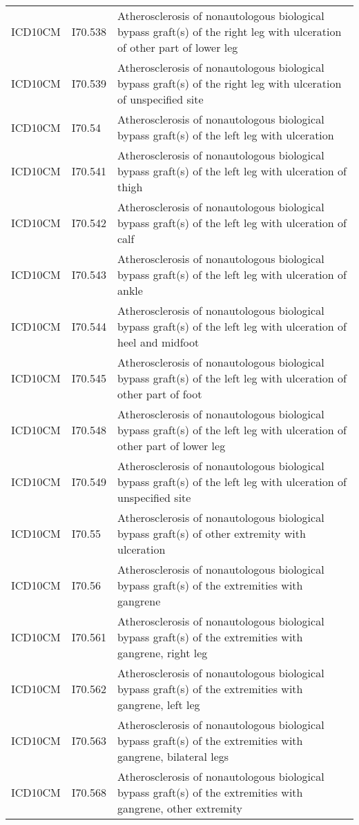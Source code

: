 \begin{longtable}{p{}p{}p{}}
  ICD10CM & I70.538 & Atherosclerosis of nonautologous biological bypass graft(s) of the right leg with ulceration of other part of lower leg \\ 
  ICD10CM & I70.539 & Atherosclerosis of nonautologous biological bypass graft(s) of the right leg with ulceration of unspecified site \\ 
  ICD10CM & I70.54 & Atherosclerosis of nonautologous biological bypass graft(s) of the left leg with ulceration \\ 
  ICD10CM & I70.541 & Atherosclerosis of nonautologous biological bypass graft(s) of the left leg with ulceration of thigh \\ 
  ICD10CM & I70.542 & Atherosclerosis of nonautologous biological bypass graft(s) of the left leg with ulceration of calf \\ 
  ICD10CM & I70.543 & Atherosclerosis of nonautologous biological bypass graft(s) of the left leg with ulceration of ankle \\ 
  ICD10CM & I70.544 & Atherosclerosis of nonautologous biological bypass graft(s) of the left leg with ulceration of heel and midfoot \\ 
  ICD10CM & I70.545 & Atherosclerosis of nonautologous biological bypass graft(s) of the left leg with ulceration of other part of foot \\ 
  ICD10CM & I70.548 & Atherosclerosis of nonautologous biological bypass graft(s) of the left leg with ulceration of other part of lower leg \\ 
  ICD10CM & I70.549 & Atherosclerosis of nonautologous biological bypass graft(s) of the left leg with ulceration of unspecified site \\ 
  ICD10CM & I70.55 & Atherosclerosis of nonautologous biological bypass graft(s) of other extremity with ulceration \\ 
  ICD10CM & I70.56 & Atherosclerosis of nonautologous biological bypass graft(s) of the extremities with gangrene \\ 
  ICD10CM & I70.561 & Atherosclerosis of nonautologous biological bypass graft(s) of the extremities with gangrene, right leg \\ 
  ICD10CM & I70.562 & Atherosclerosis of nonautologous biological bypass graft(s) of the extremities with gangrene, left leg \\ 
  ICD10CM & I70.563 & Atherosclerosis of nonautologous biological bypass graft(s) of the extremities with gangrene, bilateral legs \\ 
  ICD10CM & I70.568 & Atherosclerosis of nonautologous biological bypass graft(s) of the extremities with gangrene, other extremity \\ 

\end{longtable}
